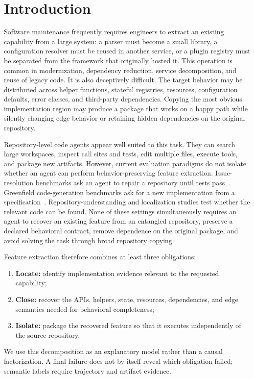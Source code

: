 \section{Introduction}
\label{sec:introduction}

Software maintenance frequently requires engineers to extract an existing
capability from a large system: a parser must become a small library, a
configuration resolver must be reused in another service, or a plugin registry
must be separated from the framework that originally hosted it. This operation
is common in modernization, dependency reduction, service decomposition, and
reuse of legacy code. It is also deceptively difficult. The target behavior may
be distributed across helper functions, stateful registries, resources,
configuration defaults, error classes, and third-party dependencies. Copying
the most obvious implementation region may produce a package that works on a
happy path while silently changing edge behavior or retaining hidden
dependencies on the original repository.

Repository-level code agents appear well suited to this task. They can search
large workspaces, inspect call sites and tests, edit multiple files, execute
tools, and package new artifacts. However, current evaluation paradigms do not
isolate whether an agent can perform behavior-preserving feature extraction.
Issue-resolution benchmarks ask an agent to repair a repository until tests
pass~\cite{jimenez2024swebench}. Greenfield code-generation benchmarks ask for
a new implementation from a specification~\cite{chen2021codex}.
Repository-understanding and localization studies test whether the relevant
code can be found. None of these settings simultaneously requires an agent to
recover an existing feature from an entangled repository, preserve a declared
behavioral contract, remove dependence on the original package, and avoid
solving the task through broad repository copying.

Feature extraction therefore combines at least three obligations:
\begin{enumerate}
  \item \textbf{Locate:} identify implementation evidence relevant to the
        requested capability;
  \item \textbf{Close:} recover the APIs, helpers, state, resources,
        dependencies, and edge semantics needed for behavioral completeness;
  \item \textbf{Isolate:} package the recovered feature so that it executes
        independently of the source repository.
\end{enumerate}
We use this decomposition as an explanatory model rather than a causal
factorization. A final failure does not by itself reveal which obligation
failed; semantic labels require trajectory and artifact evidence.


